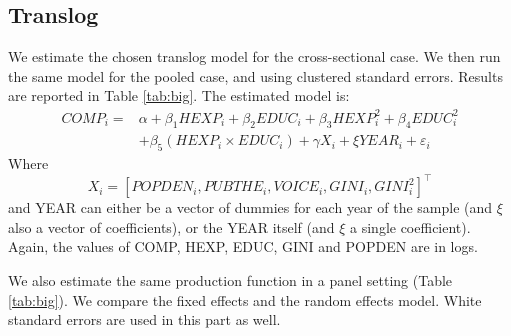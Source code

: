 \documentclass[12pt,a4paper]{article}\usepackage[]{graphicx}\usepackage[]{color}
\begin{document}
\subsection{Translog}
We estimate the chosen translog model for the cross-sectional case. We then run the same model for the pooled case, and using clustered standard errors. Results are reported in Table \ref{tab:big}. The estimated model is:
\begin{equation}
\begin{aligned}
COMP_i = & \alpha + \beta_1 HEXP_i + \beta_2 EDUC_i + \beta_3 HEXP_i^2 + \beta_4 EDUC_i^2 \\ & + \beta_5 \left(HEXP_i \times EDUC_i\right) + \gamma X_i + \xi YEAR_i + \varepsilon_i
\end{aligned}
\end{equation}
Where $$ X_i = \left[ POPDEN_i, PUBTHE_i, VOICE_i, GINI_i, GINI_i^2 \right]^\top$$ and YEAR can either be a vector of dummies for each year of the sample (and $\xi$ also a vector of coefficients), or the YEAR itself (and $\xi$ a single coefficient). Again, the values of COMP, HEXP, EDUC, GINI and POPDEN are in logs.


We also estimate the same production function in a panel setting (Table \ref{tab:big}). We compare the fixed effects and the random effects model. White standard errors are used in this part as well.
\end{document}
